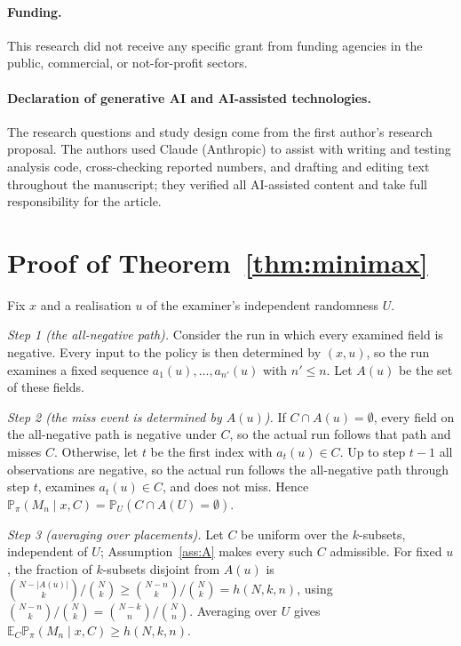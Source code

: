 \documentclass[11pt]{article}
\theoremstyle{remark}
\theoremstyle{definition}
\newcommand{\Prb}{\mathbb{P}}
\newcommand{\E}{\mathbb{E}}
\begin{document}
\paragraph{Funding.} This research did not receive any specific grant from funding agencies in the public, commercial, or not-for-profit sectors.

\paragraph{Declaration of generative AI and AI-assisted technologies.} The research questions and study design come from the first author's research proposal. The authors used Claude (Anthropic) to assist with writing and testing analysis code, cross-checking reported numbers, and drafting and editing text throughout the manuscript; they verified all AI-assisted content and take full responsibility for the article.




\appendix
\section{Proof of Theorem~\ref{thm:minimax}}\label{app:proof}
Fix $x$ and a realisation $u$ of the examiner's independent randomness $U$.

\emph{Step 1 (the all-negative path).} Consider the run in which every examined field is negative. Every input to the policy is then determined by $(x,u)$, so the run examines a fixed sequence $a_1(u),\dots,a_{n'}(u)$ with $n'\le n$. Let $A(u)$ be the set of these fields.

\emph{Step 2 (the miss event is determined by $A(u)$).} If $C\cap A(u)=\emptyset$, every field on the all-negative path is negative under $C$, so the actual run follows that path and misses $C$. Otherwise, let $t$ be the first index with $a_t(u)\in C$. Up to step $t-1$ all observations are negative, so the actual run follows the all-negative path through step $t$, examines $a_t(u)\in C$, and does not miss. Hence $\Prb_\pi(M_n\mid x,C)=\Prb_U(C\cap A(U)=\emptyset)$.

\emph{Step 3 (averaging over placements).} Let $C$ be uniform over the $k$-subsets, independent of $U$; Assumption~\ref{ass:A} makes every such $C$ admissible. For fixed $u$, the fraction of $k$-subsets disjoint from $A(u)$ is $\binom{N-|A(u)|}{k}/\binom{N}{k}\ge\binom{N-n}{k}/\binom{N}{k}=h(N,k,n)$, using $\binom{N-n}{k}/\binom{N}{k}=\binom{N-k}{n}/\binom{N}{n}$. Averaging over $U$ gives $\E_C\Prb_\pi(M_n\mid x,C)\ge h(N,k,n)$.
\end{document}
